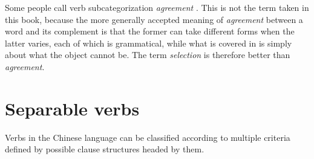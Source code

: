 \documentclass[../main.tex]{subfiles}
\begin{document}
Some people call verb subcategorization \emph{agreement} \citep[]{li1989mandarin}.
This is not the term taken in this book, 
because the more generally accepted meaning of \emph{agreement} between a word and its complement 
is that the former can take different forms when the latter varies, each of which is grammatical,
while what is covered in \citet[]{li1989mandarin} is simply about what the object cannot be.
The term \emph{selection} is therefore better than \emph{agreement}.

\section{Separable verbs}

Verbs in the Chinese language can be classified according to multiple criteria defined by possible clause 
structures headed by them. %
\end{document}
